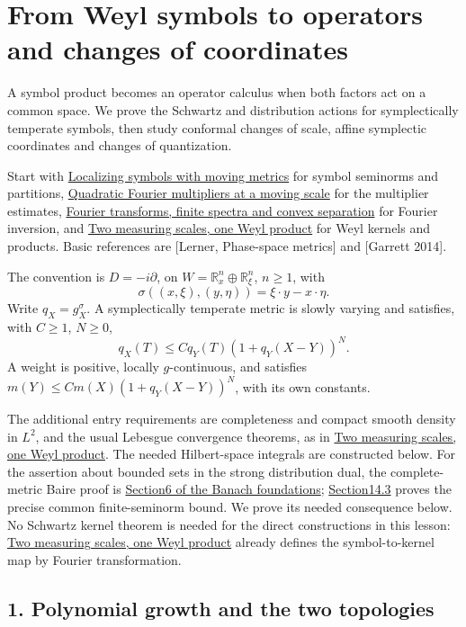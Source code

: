 \documentclass[
  11pt,
]{article}
\author{}
\date{}
\begin{document}
\section{From Weyl symbols to operators and changes of
coordinates}\label{from-weyl-symbols-to-operators-and-changes-of-coordinates}

A symbol product becomes an operator calculus when both factors act on a
common space. We prove the Schwartz and distribution actions for
symplectically temperate symbols, then study conformal changes of scale,
affine symplectic coordinates and changes of quantization.

Start with \href{metric-localization.pdf}{Localizing symbols with moving
metrics} for symbol seminorms and partitions,
\href{gauss-transform-estimates.pdf}{Quadratic Fourier multipliers at a
moving scale} for the multiplier estimates,
\href{prerequisite-bridges.pdf}{Fourier transforms, finite spectra and
convex separation} for Fourier inversion, and
\href{weyl-metric-products.pdf}{Two measuring scales, one Weyl product}
for Weyl kernels and products. Basic references are {[}Lerner,
Phase-space metrics{]} and {[}Garrett 2014{]}.

The convention is \(D=-i\partial\), on
\(W=\mathbb R_x^n\oplus\mathbb R_\xi^n\), \(n\ge1\), with \[
\sigma((x,\xi),(y,\eta))=\xi\cdot y-x\cdot\eta.
\tag{A1}
\] Write \(q_X=g_X^\sigma\). A symplectically temperate metric is slowly
varying and satisfies, with \(C\ge1\), \(N\ge0\), \[
q_X(T)\le Cq_Y(T)(1+q_Y(X-Y))^N.
\tag{A2}
\] A weight is positive, locally \(g\)-continuous, and satisfies
\(m(Y)\le Cm(X)(1+q_Y(X-Y))^N\), with its own constants.

The additional entry requirements are completeness and compact smooth
density in \(L^2\), and the usual Lebesgue convergence theorems, as in
\href{weyl-metric-products.pdf}{Two measuring scales, one Weyl product}.
The needed Hilbert-space integrals are constructed below. For the
assertion about bounded sets in the strong distribution dual, the
complete-metric Baire proof is
\href{banach-foundation-bridges.pdf}{Section6 of the Banach
foundations};
\href{banach-foundation-bridges.pdf}{Section14.3}
proves the precise common finite-seminorm bound. We prove its needed
consequence below. No Schwartz kernel theorem is needed for the direct
constructions in this lesson: \href{weyl-metric-products.pdf}{Two
measuring scales, one Weyl product} already defines the symbol-to-kernel
map by Fourier transformation.

\subsection{1. Polynomial growth and the two
topologies}\label{polynomial-growth-and-the-two-topologies}
\end{document}
